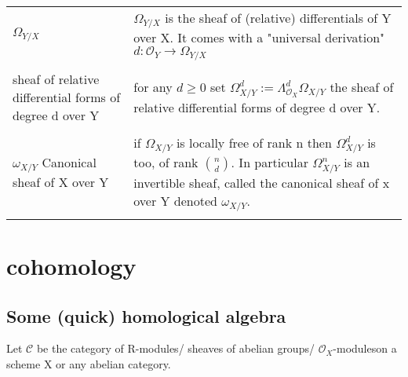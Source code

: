 \documentclass[a4paper, 12pt]{article}
\newcommand{\ca}[1]{\mathcal{#1}}
\newcommand{\oxmods}{$\mathcal{O}_X$-modules}
\newcommand{\ox}{\mathcal{O}_X}
\newcommand{\oy}{\mathcal{O}_Y}
\begin{document}
\begin{longtable}{p{}  p{} } 
	$\Omega_{Y/X}$ & $\Omega_{Y/X}$ is the sheaf of (relative) differentials of Y over X.  It comes with a "universal derivation"  $d:\oy \longrightarrow \Omega_{Y/X}$\\
	
	&\\
	
	sheaf of relative differential forms of degree d over Y & for any $d \geq 0$ set $\Omega_{X/Y}^d := \Lambda^d_{\ox} \Omega_{X/Y}$ the sheaf of relative differential forms of degree d over Y.\\
	
	&\\
	
	$\omega_{X/Y}$ Canonical sheaf of X over Y & if $\Omega_{X/Y}$ is locally free of rank n then $\Omega_{X/Y}^d$ is too, of rank $n\choose d$. In particular $\Omega_{X/Y}^n$ is an invertible sheaf, called the canonical sheaf of x over Y denoted $\omega_{X/Y}$.\\
	
	&\\
	
	
	
\end{longtable}

\section{cohomology}

\subsection{Some (quick) homological algebra}

Let $ \ca{C} $ be the category of R-modules/ sheaves of abelian groups/ \oxmods on a scheme X or any abelian category.
\end{document}

